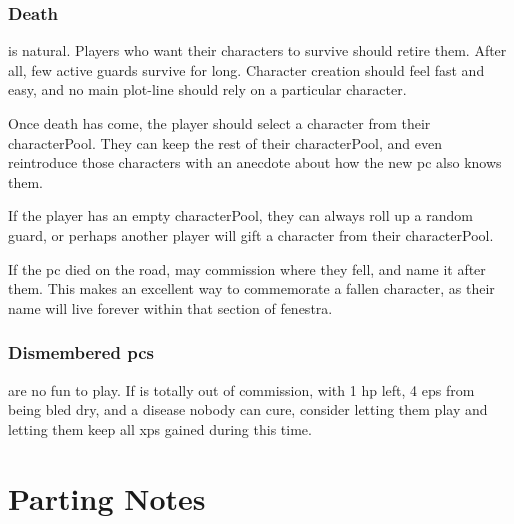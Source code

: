 \begin{multicols}{2}
\subsubsection{Death}
\label{pcdeath}
is natural.
Players who want their characters to survive should retire them.
After all, few active \glspl{guard} survive for long.
Character creation should feel fast and easy, and no main plot-line should rely on a particular character.

Once death has come, the player should select a character from their \gls{characterPool}.
They can keep the rest of their \gls{characterPool}, and even reintroduce those characters with an anecdote about how the new \gls{pc} also knows them.

If the player has an empty \gls{characterPool}, they can always roll up a random \gls{guard}, or perhaps another player will gift a character from their \gls{characterPool}.

If the \gls{pc} died on the road,  may commission  where they fell, and name it after them.
This makes an excellent way to commemorate a fallen character, as their name will live forever within that section of \gls{fenestra}.

\subsubsection{Dismembered \Glspl{pc}}
are no fun to play.
If  is totally out of commission, with 1 \gls{hp} left, 4 \glspl{ep} from being bled dry, and a disease nobody can cure, consider letting them play  and letting them keep all \glspl{xp} gained during this time.

\end{multicols}

\section{Parting Notes}

